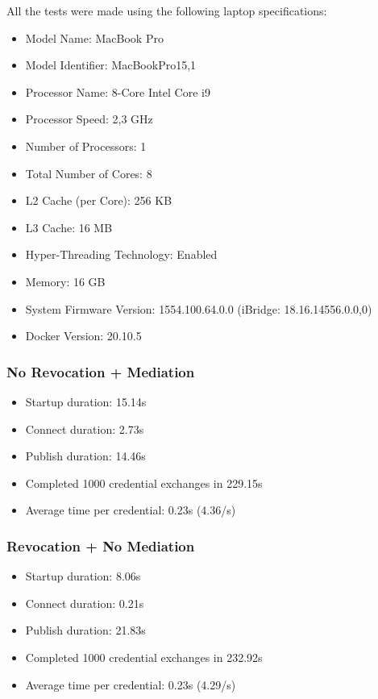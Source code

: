 All the tests were made using the following laptop specifications:

\begin{itemize}
    \item Model Name:	MacBook Pro
    \item Model Identifier:	MacBookPro15,1
    \item Processor Name:	8-Core Intel Core i9
    \item Processor Speed:	2,3 GHz
    \item Number of Processors:	1
    \item Total Number of Cores:	8
    \item L2 Cache (per Core):	256 KB
    \item L3 Cache:	16 MB
    \item Hyper-Threading Technology:	Enabled
    \item Memory:	16 GB
    \item System Firmware Version:	1554.100.64.0.0 (iBridge: 18.16.14556.0.0,0)
    \item Docker Version: 20.10.5
\end{itemize}


\subsubsection{No Revocation + Mediation}

\begin{itemize}
    \item Startup duration: 15.14s
    \item Connect duration: 2.73s
    \item Publish duration: 14.46s
    \item Completed 1000 credential exchanges in 229.15s
    \item Average time per credential: 0.23s (4.36/s)
\end{itemize}

\subsubsection{Revocation + No Mediation}

\begin{itemize}
    \item Startup duration: 8.06s
    \item Connect duration: 0.21s
    \item Publish duration: 21.83s
    \item Completed 1000 credential exchanges in 232.92s
    \item Average time per credential: 0.23s (4.29/s)
\end{itemize}

